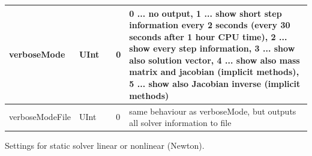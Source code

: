 \begin{center}
\begin{longtable}{| p{4.2cm} | p{2.5cm} | p{0.3cm} | p{3.0cm} | p{6cm} |}
    verboseMode &     UInt &      &     0 &     0 ... no output, 1 ... show short step information every 2 seconds (every 30 seconds after 1 hour CPU time), 2 ... show every step information, 3 ... show also solution vector, 4 ... show also mass matrix and jacobian (implicit methods), 5 ... show also Jacobian inverse (implicit methods)\\ \hline
    verboseModeFile &     UInt &      &     0 &     same behaviour as verboseMode, but outputs all solver information to file\\ \hline
	  \end{longtable}
	\end{center}



\label{sec:StaticSolverSettings}
Settings for static solver linear or nonlinear (Newton).

